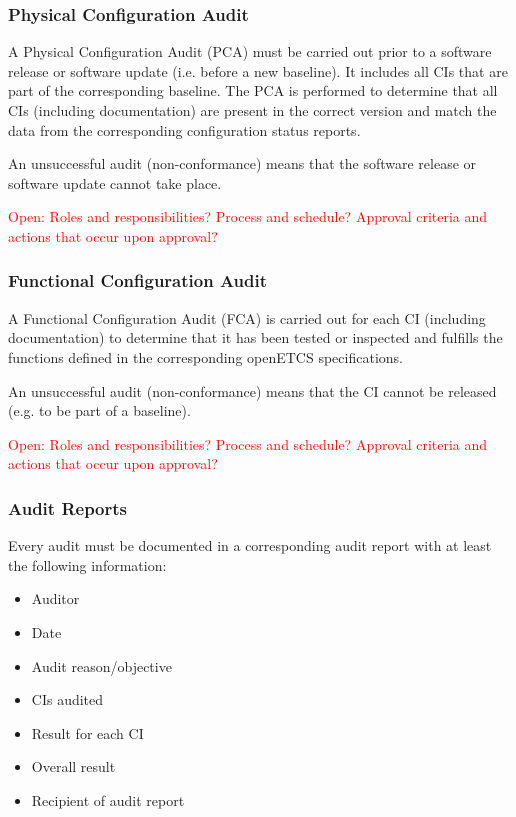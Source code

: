\documentclass{template/openetcs_article}
\begin{document}
\subsubsection{Physical Configuration Audit} %
\label{sec:Physical Configuration Audit}

A Physical Configuration Audit (PCA) must be carried out prior to a software release or software update (i.e. before a new baseline). It includes all CIs that are part of the corresponding baseline. The PCA is performed to determine that all CIs (including documentation) are present in the correct version and match the data from the corresponding configuration status reports.

An unsuccessful audit (non-conformance) means that the software release or software update cannot take place.

\textcolor{red}{Open: Roles and responsibilities? Process and schedule? Approval criteria and actions that occur upon approval?}


\subsubsection{Functional Configuration Audit} %
\label{sec:Functional Configuration Audit}

A Functional Configuration Audit (FCA) is carried out for each CI (including documentation) to determine that it has been tested or inspected and fulfills the functions defined in the corresponding openETCS specifications.

An unsuccessful audit (non-conformance) means that the CI cannot be released (e.g. to be part of a baseline).

\textcolor{red}{Open: Roles and responsibilities? Process and schedule? Approval criteria and actions that occur upon approval?}


\subsubsection{Audit Reports} %
\label{sec:Audit Reports}

Every audit must be documented in a corresponding audit report with at least the following information:

\vspace{-10pt}
\begin{itemize}
\item Auditor
\item Date
\item Audit reason/objective
\item CIs audited
\item Result for each CI
\item Overall result
\item Recipient of audit report
\end{itemize}
\end{document}
